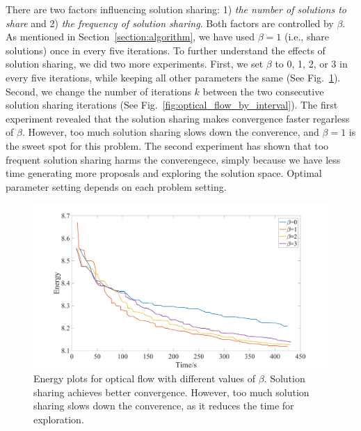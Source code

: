 There are two factors influencing solution sharing: 1) \textit{the
number of solutions to share} and 2) \textit{the frequency of solution
sharing}. Both factors are controlled by $\beta$. As mentioned in
Section~\ref{section:algorithm}, we have used $\beta = 1$ (i.e., share
solutions) once in every five iterations.  To further understand the
effects of solution sharing, we did two more experiments. First, we set
$\beta$ to 0, 1, 2, or 3 in every five iterations,
while keeping all other parameters the same (See
Fig.~\ref{fig:optical_flow_by_beta}).  Second, we change the number of
iterations $k$ between the two consecutive solution sharing iterations
(See Fig.~\ref{fig:optical_flow_by_interval}).  The first experiment
revealed that the solution sharing makes convergence faster regarless of
$\beta$.  However, too much solution sharing slows down the converence,
and $\beta=1$ is the sweet spot for this problem.
%
%
The second experiment has shown that too frequent solution sharing
harms the converengece, simply because we have less time generating more
proposals and exploring the solution space.
Optimal parameter setting depends on each problem setting.
\begin{figure}[tb]
  \includegraphics[width=\columnwidth]{figure/optical_flow_by_beta.png}
  \caption{Energy plots for optical flow with different values of
  $\beta$. Solution sharing achieves better convergence. However, too
  much solution sharing slows down the converence, as it reduces the
 time for exploration.}\label{fig:optical_flow_by_beta}
\end{figure}
